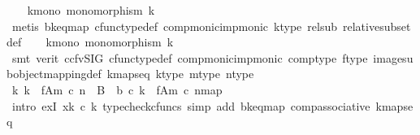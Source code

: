 \begin{isabellebody}
\ \ \isamarkupfalse%
\ k{\isacharunderscore}{\kern0pt}mono{\isacharcolon}{\kern0pt}\ {\isachardoublequoteopen}monomorphism\ k{\isachardoublequoteclose}\isanewline
\ \ \ \ \isamarkupfalse%
\ {\isacharparenleft}{\kern0pt}metis\ b{\isacharunderscore}{\kern0pt}k{\isacharunderscore}{\kern0pt}eq{\isacharunderscore}{\kern0pt}map\ cfunc{\isacharunderscore}{\kern0pt}type{\isacharunderscore}{\kern0pt}def\ comp{\isacharunderscore}{\kern0pt}monic{\isacharunderscore}{\kern0pt}imp{\isacharunderscore}{\kern0pt}monic\ k{\isacharunderscore}{\kern0pt}type\ rel{\isacharunderscore}{\kern0pt}sub{}\ relative{\isacharunderscore}{\kern0pt}subset{\isacharunderscore}{\kern0pt}def{}{\isacharparenright}{\kern0pt}\isanewline
\ \ \isamarkupfalse%
\ k{\isacharprime}{\kern0pt}{\isacharunderscore}{\kern0pt}mono{\isacharcolon}{\kern0pt}\ {\isachardoublequoteopen}monomorphism\ k{\isacharprime}{\kern0pt}{\isachardoublequoteclose}\isanewline
\ \ \ \ \isamarkupfalse%
\ {\isacharparenleft}{\kern0pt}smt\ {\isacharparenleft}{\kern0pt}verit{\isacharcomma}{\kern0pt}\ ccfv{\isacharunderscore}{\kern0pt}SIG{\isacharparenright}{\kern0pt}\ cfunc{\isacharunderscore}{\kern0pt}type{\isacharunderscore}{\kern0pt}def\ comp{\isacharunderscore}{\kern0pt}monic{\isacharunderscore}{\kern0pt}imp{\isacharunderscore}{\kern0pt}monic\ comp{\isacharunderscore}{\kern0pt}type\ f{\isacharunderscore}{\kern0pt}type\ image{\isacharunderscore}{\kern0pt}subobject{\isacharunderscore}{\kern0pt}mapping{\isacharunderscore}{\kern0pt}def{}\ k{\isacharprime}{\kern0pt}{\isacharunderscore}{\kern0pt}maps{\isacharunderscore}{\kern0pt}eq\ k{\isacharprime}{\kern0pt}{\isacharunderscore}{\kern0pt}type\ m{\isacharunderscore}{\kern0pt}type\ n{\isacharunderscore}{\kern0pt}type{\isacharparenright}{\kern0pt}\isanewline
\isanewline
\ \ \isamarkupfalse%
\ {\isachardoublequoteopen}{\isasymexists}k{\isachardot}{\kern0pt}\ k\ {\isacharcolon}{\kern0pt}\ f{\isasymlparr}A{\isasymrparr}\isactrlbsub m\ {\isasymcirc}\isactrlsub c\ n\isactrlesub \ {\isasymrightarrow}\ B\ {\isasymand}\ b\ {\isasymcirc}\isactrlsub c\ k\ {\isacharequal}{\kern0pt}\ {\isacharbrackleft}{\kern0pt}f{\isasymlparr}A{\isasymrparr}\isactrlbsub m\ {\isasymcirc}\isactrlsub c\ n\isactrlesub {\isacharbrackright}{\kern0pt}map{\isachardoublequoteclose}\isanewline
\ \ \ \ \isamarkupfalse%
\ {\isacharparenleft}{\kern0pt}intro\ exI{\isacharbrackleft}{\kern0pt}\ x{\isacharequal}{\kern0pt}{\isachardoublequoteopen}k\ {\isasymcirc}\isactrlsub c\ k{\isacharprime}{\kern0pt}{\isachardoublequoteclose}{\isacharbrackright}{\kern0pt}{\isacharcomma}{\kern0pt}\ typecheck{\isacharunderscore}{\kern0pt}cfuncs{\isacharcomma}{\kern0pt}\ simp\ add{\isacharcolon}{\kern0pt}\ b{\isacharunderscore}{\kern0pt}k{\isacharunderscore}{\kern0pt}eq{\isacharunderscore}{\kern0pt}map\ comp{\isacharunderscore}{\kern0pt}associative{}\ k{\isacharprime}{\kern0pt}{\isacharunderscore}{\kern0pt}maps{\isacharunderscore}{\kern0pt}eq{\isacharparenright}{\kern0pt}\isanewline

\end{isabellebody}
